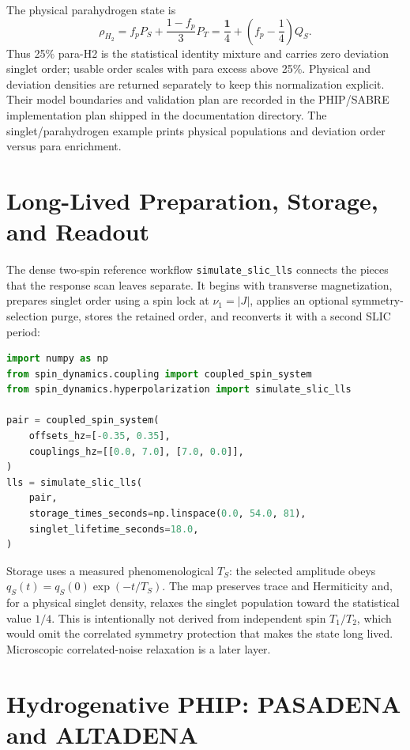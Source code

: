 \documentclass[11pt,oneside]{report}
\newcommand{\code}[1]{\texttt{#1}}
\begin{document}
The physical parahydrogen state is
\[
 \rho_{H_2}=f_pP_S+\frac{1-f_p}{3}P_T
 =\frac{\mathbf{1}}4+\left(f_p-\frac14\right)Q_S.
\]
Thus 25\% para-H2 is the statistical identity mixture and carries zero
deviation singlet order; usable order scales with para excess above 25\%.
Physical and deviation densities are returned separately to keep this
normalization explicit. Their model boundaries and validation plan are recorded
in the PHIP/SABRE implementation plan shipped in the documentation directory.
The singlet/parahydrogen example prints physical populations and deviation
order versus para enrichment.

\section{Long-Lived Preparation, Storage, and Readout}

The dense two-spin reference workflow \code{simulate\_slic\_lls} connects the
pieces that the response scan leaves separate. It begins with transverse
magnetization, prepares singlet order using a spin lock at
\(\nu_1=\lvert J\rvert\), applies an optional symmetry-selection purge, stores
the retained order, and reconverts it with a second SLIC period:

\begin{lstlisting}[language=Python]
import numpy as np
from spin_dynamics.coupling import coupled_spin_system
from spin_dynamics.hyperpolarization import simulate_slic_lls

pair = coupled_spin_system(
    offsets_hz=[-0.35, 0.35],
    couplings_hz=[[0.0, 7.0], [7.0, 0.0]],
)
lls = simulate_slic_lls(
    pair,
    storage_times_seconds=np.linspace(0.0, 54.0, 81),
    singlet_lifetime_seconds=18.0,
)
\end{lstlisting}

Storage uses a measured phenomenological \(T_S\): the selected amplitude obeys
\(q_S(t)=q_S(0)\exp(-t/T_S)\). The map preserves trace and Hermiticity and, for
a physical singlet density, relaxes the singlet population toward the
statistical value \(1/4\). This is intentionally not derived from independent
spin \(T_1/T_2\), which would omit the correlated symmetry protection that
makes the state long lived. Microscopic correlated-noise relaxation is a later
layer.

\section{Hydrogenative PHIP: PASADENA and ALTADENA}
\end{document}
